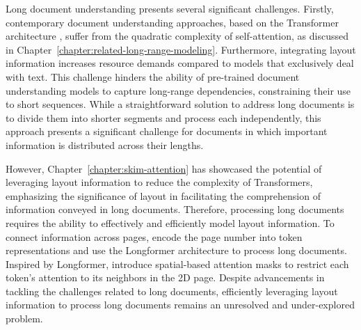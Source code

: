 

\newpage

\minitoc
{}

Long document understanding presents several significant challenges. Firstly, contemporary document understanding approaches, based on the Transformer architecture \citep{vaswani2017attention}, suffer from the quadratic complexity of self-attention, as discussed in Chapter~\ref{chapter:related-long-range-modeling}. Furthermore, integrating layout information increases resource demands compared to models that exclusively deal with text. This challenge hinders the ability of pre-trained document understanding models to capture long-range dependencies, constraining their use to short sequences. While a straightforward solution to address long documents is to divide them into shorter segments and process each independently, this approach presents a significant challenge for documents in which important information is distributed across their lengths.

However, Chapter~\ref{chapter:skim-attention} has showcased the potential of leveraging layout information to reduce the complexity of Transformers, emphasizing the significance of layout in facilitating the comprehension of information conveyed in long documents. Therefore, processing long documents requires the ability to effectively and efficiently model layout information. To connect information across pages, \citet{pramanik2020towards} encode the page number into token representations and use the Longformer architecture \citep{beltagy2020longformer} to process long documents. Inspired by Longformer, \citet{pham2022understanding} introduce spatial-based attention masks to restrict each token's attention to its neighbors in the 2D page. Despite advancements in tackling the challenges related to long documents, efficiently leveraging layout information to process long documents remains an unresolved and under-explored problem.

